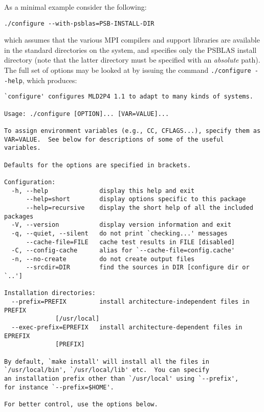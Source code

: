 As a minimal example consider the following:
\begin{verbatim}
./configure --with-psblas=PSB-INSTALL-DIR
\end{verbatim}
which assumes that the various MPI compilers and support libraries are
available in the standard directories on the system, and specifies
only the PSBLAS install  directory (note that the latter directory must
be specified with an {\em absolute} path).
The full set of options may be looked at by issuing the command
\verb|./configure --help|, which produces:
\begin{verbatim}
`configure' configures MLD2P4 1.1 to adapt to many kinds of systems.

Usage: ./configure [OPTION]... [VAR=VALUE]...

To assign environment variables (e.g., CC, CFLAGS...), specify them as
VAR=VALUE.  See below for descriptions of some of the useful variables.

Defaults for the options are specified in brackets.

Configuration:
  -h, --help              display this help and exit
      --help=short        display options specific to this package
      --help=recursive    display the short help of all the included packages
  -V, --version           display version information and exit
  -q, --quiet, --silent   do not print `checking...' messages
      --cache-file=FILE   cache test results in FILE [disabled]
  -C, --config-cache      alias for `--cache-file=config.cache'
  -n, --no-create         do not create output files
      --srcdir=DIR        find the sources in DIR [configure dir or `..']

Installation directories:
  --prefix=PREFIX         install architecture-independent files in PREFIX
			  [/usr/local]
  --exec-prefix=EPREFIX   install architecture-dependent files in EPREFIX
			  [PREFIX]

By default, `make install' will install all the files in
`/usr/local/bin', `/usr/local/lib' etc.  You can specify
an installation prefix other than `/usr/local' using `--prefix',
for instance `--prefix=$HOME'.

For better control, use the options below.


\end{verbatim}
